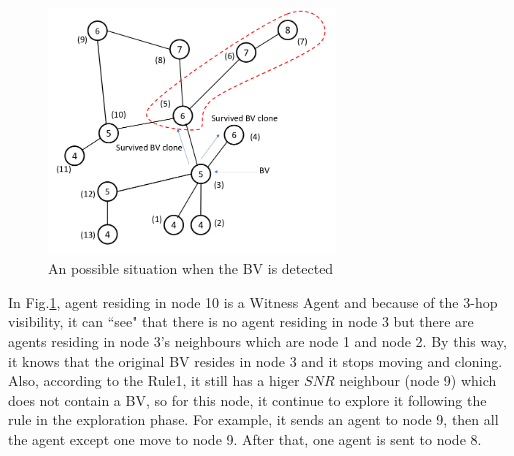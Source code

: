 \begin{figure}[H]
  \centering  
  \includegraphics[width=3in]{figures/Arbi3.png}
  \caption{An possible situation when the BV is detected}\label{fig:Arbi3}
\end{figure}    

In Fig.\ref{fig:Arbi3}, agent residing in node 10 is a Witness Agent and because of the 3-hop visibility, it can ``see" that there is no agent residing in node 3 but there are agents residing in node 3's neighbours which are node 1 and node 2. By this way, it knows that the original BV resides in node 3 and it stops moving and cloning. Also, according to the Rule1, it still has a higer $SNR$ neighbour (node 9) which does not contain a BV, so for this node, it continue to explore it following the rule in the exploration phase. For example, it sends an agent to node 9, then all the agent except one move to node 9. After that, one agent is sent to node 8. 


